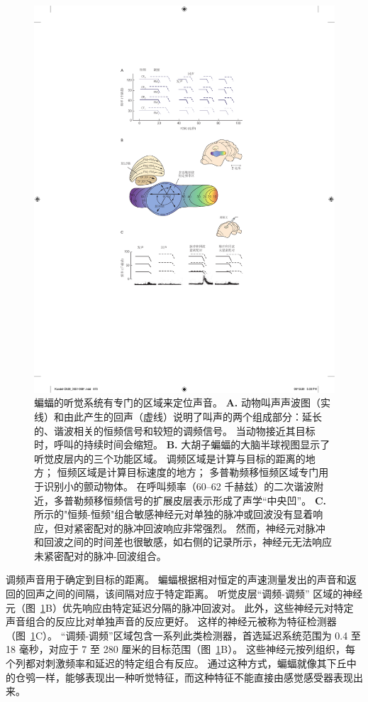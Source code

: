 \begin{figure}[htbp]
	\centering
	\includegraphics[width=0.65\linewidth]{chap28/fig_28_14}
	\caption{蝙蝠的听觉系统有专门的区域来定位声音。
		\textbf{A.} 动物叫声声波图（实线）和由此产生的回声（虚线）说明了叫声的两个组成部分：延长的、谐波相关的恒频信号和较短的调频信号。 
		当动物接近其目标时，呼叫的持续时间会缩短\cite{suga1984neural}。
		\textbf{B.} 大胡子蝙蝠的大脑半球视图显示了听觉皮层内的三个功能区域。
		调频区域是计算与目标的距离的地方；
		恒频区域是计算目标速度的地方；
		多普勒频移恒频区域专门用于识别小的颤动物体。
		在呼叫频率（60–62 千赫兹）的二次谐波附近，多普勒频移恒频信号的扩展皮层表示形成了声学“中央凹”\cite{suga1984neural}。
		\textbf{C.} 所示的"恒频-恒频"组合敏感神经元对单独的脉冲或回波没有显着响应，但对紧密配对的脉冲回波响应非常强烈。
		然而，神经元对脉冲和回波之间的时间差也很敏感，如右侧的记录所示，神经元无法响应未紧密配对的脉冲-回波组合\cite{suga1983specificity}。}
	\label{fig:28_14}
\end{figure}


调频声音用于确定到目标的距离。
蝙蝠根据相对恒定的声速测量发出的声音和返回的回声之间的间隔，该间隔对应于特定距离。
听觉皮层“调频-调频” 区域的神经元（图~\ref{fig:28_14}B）优先响应由特定延迟分隔的脉冲回波对。
此外，这些神经元对特定声音组合的反应比对单独声音的反应更好。
这样的神经元被称为特征检测器（图~\ref{fig:28_14}C）。
“调频-调频”区域包含一系列此类检测器，首选延迟系统范围为 0.4 至 18 毫秒，对应于 7 至 280 厘米的目标范围（图~\ref{fig:28_14}B）。
这些神经元按列组织，每个列都对刺激频率和延迟的特定组合有反应。
通过这种方式，蝙蝠就像其下丘中的仓鸮一样，能够表现出一种听觉特征，而这种特征不能直接由感觉感受器表现出来。


